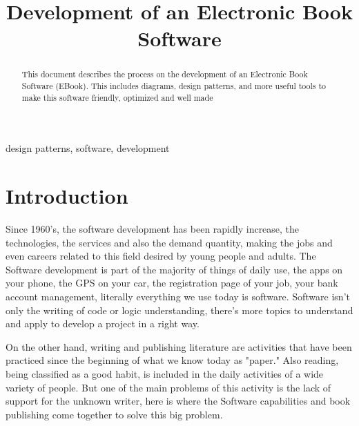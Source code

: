 \documentclass[conference]{IEEEtran}
\begin{document}
\title{Development of an Electronic Book Software\\
}

\author{
\and
{}
}

\maketitle

\begin{abstract}
This document describes the process on the development of an Electronic Book Software (EBook). This includes diagrams, design patterns, and more useful tools to make this software friendly, optimized and well made 
\end{abstract}

\begin{IEEEkeywords}
design patterns, software, development
\end{IEEEkeywords}

\section{Introduction}
Since 1960's, the software development has been rapidly increase, the technologies, the services and also the demand quantity, making the jobs and even careers related to this field desired by young people and adults. The Software development is part of the majority of things of daily use, the apps on your phone, the GPS on your car, the registration page of your job, your bank account management, literally everything we use today is software. Software isn't only the writing of code or logic understanding, there's more topics to understand and apply to develop a project in a right way.

On the other hand, writing and publishing literature are activities that have been practiced since the beginning of what we know today as "paper." Also reading, being classified as a good habit, is included in the daily activities of a wide variety of people. But one of the main problems of this activity is the lack of support for the unknown writer, here is where the Software capabilities and book publishing come together to solve this big problem.
\end{document}
